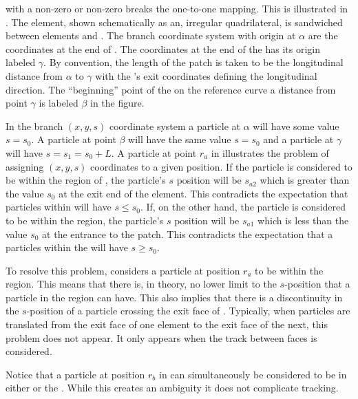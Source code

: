 with a non-zero  or non-zero  breaks the one-to-one mapping. This is
illustrated in .  The  element, shown schematically as an, irregular
quadrilateral, is sandwiched between elements  and . The branch coordinate system
with origin at $\alpha$ are the coordinates at the end of . The coordinates at the end of
the  has its origin labeled $\gamma$. By convention, the length of the patch  is
taken to be the longitudinal distance from $\alpha$ to $\gamma$ with the 's exit
coordinates defining the longitudinal direction. The ``beginning'' point of the  on the
reference curve a distance  from point $\gamma$ is labeled $\beta$ in the figure.

In the branch $(x, y, s)$ coordinate system a particle at $\alpha$ will have some value $s = s_0$. A
particle at point $\beta$ will have the same value $s = s_0$ and a particle at $\gamma$ will have $s
= s_1 = s_0 + L$. A particle at point $r_a$ in  illustrates the problem of
assigning $(x, y, s)$ coordinates to a given position. If the particle is considered to be within
the region of , the particle's $s$ position will be $s_{a2}$ which is greater than the
value $s_0$ at the exit end of the element. This contradicts the expectation that particles within
 will have $s \le s_0$.  If, on the other hand, the particle is considered to be within
the  region, the particle's $s$ position will be $s_{a1}$ which is less than the value
$s_0$ at the entrance to the patch. This contradicts the expectation that a particles within the
 will have $s \ge s_0$.

To resolve this problem, \accellat considers a particle at position $r_a$ to be within the 
region. This means that there is, in theory, no lower limit to the $s$-position that a particle in
the  region can have. This also implies that there is a discontinuity in the $s$-position
of a particle crossing the exit face of . Typically, when particles are translated from the
exit face of one element to the exit face of the next, this  problem does not appear. It
only appears when the track between faces is considered.

Notice that a particle at position $r_b$ in  can simultaneously be considered to
be in either  or the . While this creates an ambiguity it does not complicate
tracking.

